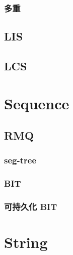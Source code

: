 \subsubsection{多重}


\subsection{LIS}


\subsection{LCS}


\section{Sequence}

\subsection{RMQ}
\subsubsection{seg-tree}


\subsubsection{BIT}


\subsubsection{可持久化 BIT}


% 

\section{String}

